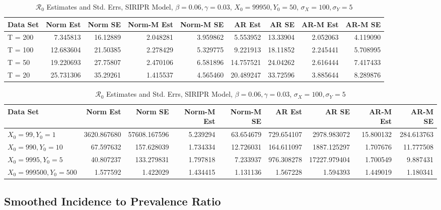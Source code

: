 \documentclass[12pt]{article}
\newcommand{\rr}{\ensuremath{\mathcal{R}_0}}
\begin{document}
\begin{table}[H]
	
	\caption{\label{tab:}$\rr$ Estimates and Std. Errs, SIRIPR Model,
		$\beta = 0.06, \gamma = 0.03$, $X_0 = 99950, Y_0 = 50$, $\sigma_X = 100, \sigma_Y = 5$}
	\centering
	\begin{tabular}[t]{l|r|r|r|r|r|r|r|r}
		\hline
		Data Set & Norm Est & Norm SE & Norm-M Est & Norm-M SE & AR Est & AR SE & AR-M Est & AR-M SE\\
		\hline
		T = 200 & 7.345813 & 16.12889 & 2.048281 & 3.959862 & 5.553952 & 13.33904 & 2.052063 & 4.119090\\
		\hline
		T = 100 & 12.683604 & 21.50385 & 2.278429 & 5.329775 & 9.221913 & 18.11852 & 2.245441 & 5.708995\\
		\hline
		T = 50 & 19.220693 & 27.75807 & 2.470106 & 6.581896 & 14.757521 & 24.04262 & 2.616444 & 7.417433\\
		\hline
		T = 20 & 25.731306 & 35.29261 & 1.415537 & 4.565460 & 20.489247 & 33.72596 & 3.885644 & 8.289876\\
		\hline
	\end{tabular}
\end{table}

\begin{table}[H]
	
	\caption{\label{tab:}$\rr$ Estimates and Std. Errs, SIRIPR Model,
		$\beta = 0.06, \gamma = 0.03$, $\sigma_X = 100, \sigma_Y = 5$}
	\centering
	\begin{tabular}[t]{l|r|r|r|r|r|r|r|r}
		\hline
		Data Set & Norm Est & Norm SE & Norm-M Est & Norm-M SE & AR Est & AR SE & AR-M Est & AR-M SE\\
		\hline
		$X_0 = 99, Y_0 = 1$ & 3620.867680 & 57608.167596 & 5.239294 & 63.654679 & 729.654107 & 2978.983072 & 15.800132 & 284.613763\\
		\hline
		$X_0 = 990, Y_0 = 10$ & 67.597632 & 157.628039 & 1.734334 & 12.726031 & 164.611097 & 1887.125297 & 1.707676 & 11.777508\\
		\hline
		$X_0 = 9995, Y_0 = 5$ & 40.807237 & 133.279831 & 1.797818 & 7.233937 & 976.308278 & 17227.979404 & 1.700549 & 9.887431\\
		\hline
		$X_0 = 999500, Y_0 = 500$ & 1.577592 & 1.422029 & 1.434415 & 1.131136 & 1.567228 & 1.594393 & 1.449019 & 1.180341\\
		\hline
	\end{tabular}
\end{table}

\subsection{Smoothed Incidence to Prevalence Ratio}
\end{document}
